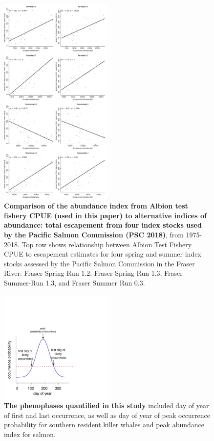 \documentclass{article}
\begin{document}
\begin{figure}[!hp]
\includegraphics[width=0.5\textwidth]{../analyses/orcaphen/figures/ctcalbion.png}
\caption{\textbf{Comparison of the abundance index from Albion test fishery CPUE (used in this paper) to alternative indices of abundance: total escapement from four index stocks used by the Pacific Salmon Commission (PSC 2018)}, from 1975-2018. Top row shows relationship between Albion Test Fishery CPUE to escapement estimates for four spring and summer index stocks assessed by the Pacific Salmon Commission in the Fraser River: Fraser Spring-Run 1.2, Fraser Spring-Run 1.3, Fraser Summer-Run 1.3, and Fraser Summer Run 0.3.}
\label{fig:ctcalb}
\end{figure}
\begin{figure}[!hp]
\includegraphics[width=0.5\textwidth]{../analyses/figures/phenophases.pdf}
\caption{\textbf{The phenophases quantified in this study} included day of year of first and last occurrence, as well as day of year of peak occurrence probability for southern resident killer whales and peak abundance index for salmon.}
\label{fig:ctcalb}
\end{figure}
\end{document}
